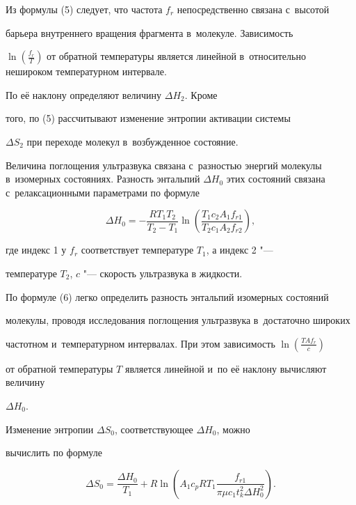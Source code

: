 Из формулы (5) следует, что частота $f_{r }$ непосредственно связана с~высотой 

барьера внутреннего вращения фрагмента в~молекуле. Зависимость 

$\ln\left(\frac{f_{r} }T\right)$ от обратной температуры является линейной в~относительно нешироком температурном интервале. 

По её наклону определяют величину $\Delta H_{2}$. Кроме 

того, по (5) рассчитывают изменение энтропии активации системы 

$\Delta S_{2}$ при переходе молекул в~возбужденное состояние. 



Величина поглощения ультразвука связана с~разностью энергий молекулы в~изомерных состояниях. Разность энтальпий $\Delta H_{0}$ этих состояний связана с~релаксационными параметрами по формуле

\begin{equation}

\Delta H_0 =- \frac{RT_1 T_2 }{T_2 -T_1 }\ln 

\left( \frac{T_1 c_2 A_1 f_{r1}}{T_2 c_1 

A_2 f_{r2} } \right),

\end{equation}

где индекс 1 у $f_r$ соответствует температуре $T_{1}$, а индекс 2 "---

температуре $T_{2}$, $c$ "--- скорость ультразвука в жидкости. 



По формуле (6) легко определить разность энтальпий изомерных состояний 

молекулы, проводя исследования поглощения ультразвука в~достаточно широких 

частотном и~температурном интервалах. При этом зависимость $\ln \left(\frac{TAf_r}c\right)$ 

от обратной температуры $T$ является линейной и~по её наклону вычисляют величину 

$\Delta H_{0}$.



Изменение энтропии $\Delta S_0 $, соответствующее $\Delta H_0 $, можно 

вычислить по формуле

\begin{equation}

\Delta S_0 =\frac{\Delta H_0 }{T_1 }+R\ln \left( {A_1 c_p R

T_1 \frac{f_{r1} }{\pi \mu c_1 t_k^2 \Delta 

H_0^2 }} \right).

\end{equation}

